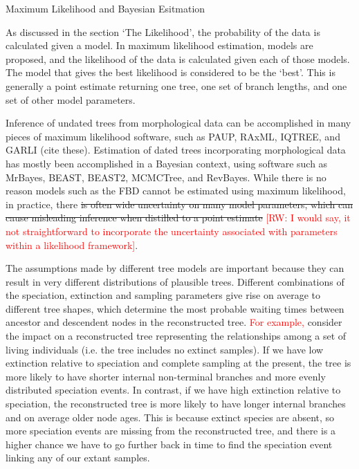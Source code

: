 \documentclass[11pt]{article}
\newcommand{\rw}[1]{{\textcolor{red}{[RW: #1]}}} %
\newcommand{\edit}[1]{{\textcolor{red}{#1}}} %
\begin{document}
\begin{boxedtext}{Maximum Likelihood and Bayesian Esitmation}

As discussed in the section `The Likelihood', the probability of the data is calculated given a model. 
In maximum likelihood estimation, models are proposed, and the likelihood of the data is calculated given each of those models.
The model that gives the best likelihood is considered to be the `best'.
This is generally a point estimate returning one tree, one set of branch lengths, and one set of other model parameters.

Inference of undated trees from morphological data can be accomplished in many pieces of maximum likelihood software, such as PAUP, RAxML, IQTREE, and GARLI (cite these).
Estimation of dated trees incorporating morphological data has mostly been accomplished in a Bayesian context, using software such as MrBayes, BEAST, BEAST2, MCMCTree, and RevBayes.
While there is no reason models such as the FBD cannot be estimated using maximum likelihood, in practice, there \sout{is often wide uncertainty on many model parameters, which can cause misleading inference when distilled to a point estimate} \rw{I would say, it not straightforward to incorporate the uncertainty associated with parameters within a likelihood framework}.
\end{boxedtext}


The assumptions made by different tree models are important because they can result in very different distributions of plausible trees.
Different combinations of the speciation, extinction and sampling parameters give rise on average to different tree shapes, which determine the most probable waiting times between ancestor and descendent nodes 
in the reconstructed tree.
 \edit{For example,} consider the impact on a reconstructed tree representing the relationships among a set of living individuals (i.e. the tree includes no extinct samples). 
If we have low extinction relative to speciation and complete sampling at the present, the tree is more likely to have shorter internal non-terminal branches and more evenly distributed speciation events.
In contrast, if we have high extinction relative to speciation, the reconstructed tree is more likely to have longer internal branches and on average older node ages. 
This is because extinct species are absent, so more speciation events are missing from the reconstructed tree, and there is a higher chance we have to go further back in time to find the speciation event linking any of our extant samples.
\end{document}

